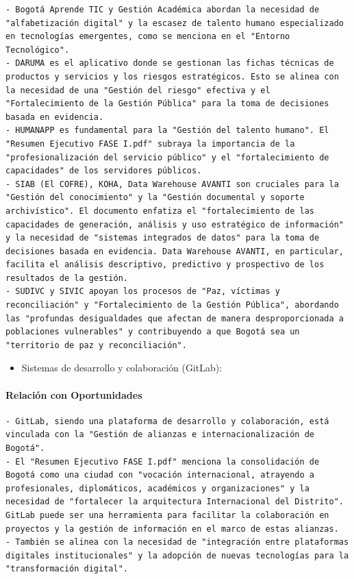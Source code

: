 \documentclass[
	a4paper, %
	12pt, %
]{include/CSSullivanBusinessReport}
\def\tightlist{}
\begin{document}
\begin{verbatim}
- Bogotá Aprende TIC y Gestión Académica abordan la necesidad de "alfabetización digital" y la escasez de talento humano especializado en tecnologías emergentes, como se menciona en el "Entorno Tecnológico".
- DARUMA es el aplicativo donde se gestionan las fichas técnicas de productos y servicios y los riesgos estratégicos. Esto se alinea con la necesidad de una "Gestión del riesgo" efectiva y el "Fortalecimiento de la Gestión Pública" para la toma de decisiones basada en evidencia.
- HUMANAPP es fundamental para la "Gestión del talento humano". El "Resumen Ejecutivo FASE I.pdf" subraya la importancia de la "profesionalización del servicio público" y el "fortalecimiento de capacidades" de los servidores públicos.
- SIAB (El COFRE), KOHA, Data Warehouse AVANTI son cruciales para la "Gestión del conocimiento" y la "Gestión documental y soporte archivístico". El documento enfatiza el "fortalecimiento de las capacidades de generación, análisis y uso estratégico de información" y la necesidad de "sistemas integrados de datos" para la toma de decisiones basada en evidencia. Data Warehouse AVANTI, en particular, facilita el análisis descriptivo, predictivo y prospectivo de los resultados de la gestión.
- SUDIVC y SIVIC apoyan los procesos de "Paz, víctimas y reconciliación" y "Fortalecimiento de la Gestión Pública", abordando las "profundas desigualdades que afectan de manera desproporcionada a poblaciones vulnerables" y contribuyendo a que Bogotá sea un "territorio de paz y reconciliación".
\end{verbatim}

\begin{itemize}
\tightlist
\item
  Sistemas de desarrollo y colaboración (GitLab):
\end{itemize}

\paragraph{Relación con
Oportunidades}\label{sec:relaciuxf3n-con-oportunidades}

\begin{verbatim}
- GitLab, siendo una plataforma de desarrollo y colaboración, está vinculada con la "Gestión de alianzas e internacionalización de Bogotá".
- El "Resumen Ejecutivo FASE I.pdf" menciona la consolidación de Bogotá como una ciudad con "vocación internacional, atrayendo a profesionales, diplomáticos, académicos y organizaciones" y la necesidad de "fortalecer la arquitectura Internacional del Distrito". GitLab puede ser una herramienta para facilitar la colaboración en proyectos y la gestión de información en el marco de estas alianzas.
- También se alinea con la necesidad de "integración entre plataformas digitales institucionales" y la adopción de nuevas tecnologías para la "transformación digital".
\end{verbatim}
\end{document}

